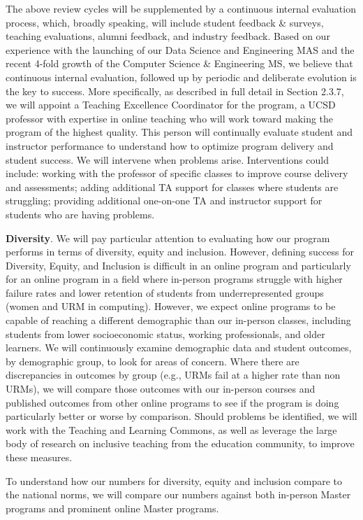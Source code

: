 \documentclass[11pt,letterpaper]{article}
\begin{document}
The above review cycles will be supplemented by a continuous internal
evaluation process, which, broadly speaking, will include student
feedback \& surveys, teaching evaluations, alumni feedback, and
industry feedback. Based on our experience with the launching of our
Data Science and Engineering MAS and the recent 4-fold growth of the
Computer Science \& Engineering MS, we believe that continuous internal
evaluation, followed up by periodic and deliberate evolution is the
key to success. More specifically, as described in full detail in
Section 2.3.7, we will appoint a Teaching Excellence Coordinator for
the program, a UCSD professor with expertise in online teaching who
will work toward making the program of the highest quality. This
person will continually evaluate student and instructor performance to
understand how to optimize program delivery and student success. We
will intervene when problems arise. Interventions could include:
working with the professor of specific classes to improve course
delivery and assessments; adding additional TA support for classes
where students are struggling; providing additional one-on-one TA and
instructor support for students who are having problems.

{\bf Diversity}. We will pay particular attention to evaluating how our
program performs in terms of diversity, equity and inclusion. However,
defining success for Diversity, Equity, and Inclusion is difficult in
an online program and particularly for an online program in a field
where in-person programs struggle with higher failure rates and lower
retention of students from underrepresented groups (women and URM in
computing). However, we expect online programs to be capable of
reaching a different demographic than our in-person classes, including
students from lower socioeconomic status, working professionals, and
older learners. We will continuously examine demographic data and
student outcomes, by demographic group, to look for areas of concern.
Where there are discrepancies in outcomes by group (e.g., URMs fail at
a higher rate than non URMs), we will compare those outcomes with our
in-person courses and published outcomes from other online programs to
see if the program is doing particularly better or worse by comparison.
Should problems be identified, we will work with the Teaching and
Learning Commons, as well as leverage the large body of research on
inclusive teaching from the education community, to improve these
measures.

To understand how our numbers for diversity, equity and inclusion
compare to the national norms, we will compare our numbers against
both in-person Master programs and prominent online Master programs.
\end{document}
